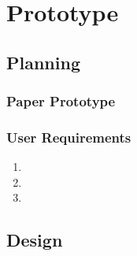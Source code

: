 
\section{Prototype} %
\label{sec:prototype}

\subsection{Planning} %
\label{sub:planning}

\subsubsection{Paper Prototype} %
\label{ssub:paper_prototype}




\subsubsection{User Requirements} %
\label{ssub:user_requirements}

\begin{enumerate}
    \item
    \item
    \item
\end{enumerate}




\subsection{Design} %
\label{sub:design}

